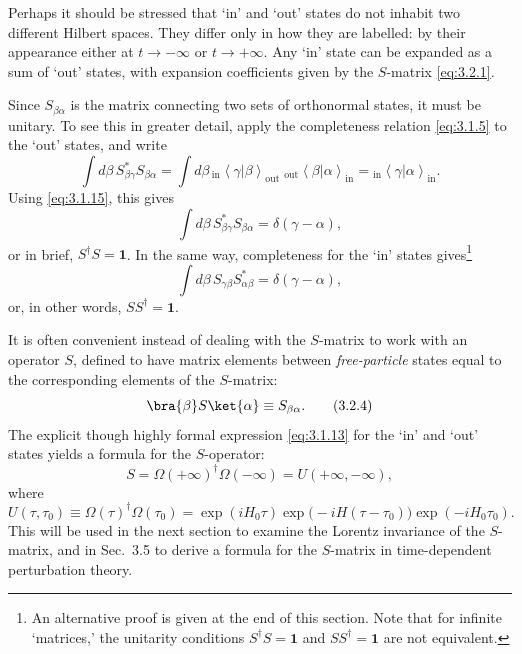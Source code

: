 Perhaps it should be stressed that `in' and `out' states do not inhabit two
different Hilbert spaces. They differ only in how they are labelled: by their
appearance either at $t\to-\infty$ or $t\to+\infty$. Any `in' state can be
expanded as a sum of `out' states, with expansion coefficients given by the
$S$-matrix \eqref{eq:3.2.1}.

Since $S_{\beta\alpha}$ is the matrix connecting two sets of orthonormal
states, it must be unitary. To see this in greater detail, apply the
completeness relation \eqref{eq:3.1.5} to the `out' states, and write
\[
\int d\beta\,S^*_{\beta\gamma}S_{\beta\alpha}
=\int d\beta\,
{}_{\mathrm{in}}\!\left\langle\gamma|\beta\right\rangle_{\mathrm{out}}
\;
{}_{\mathrm{out}}\!\left\langle\beta | \alpha\right\rangle_{\mathrm{in}}
={}_{\mathrm{in}}\!\left\langle\gamma
|\alpha\right\rangle_{\mathrm{in}}.
\]
Using \eqref{eq:3.1.15}, this gives
\begin{equation}
\int d\beta\,S^*_{\beta\gamma}S_{\beta\alpha}
=\delta(\gamma-\alpha),
\tag{3.2.2}\label{eq:3.2.2}
\end{equation}
or in brief, $S^\dagger S=\mathbf{1}$. In the same way, completeness for the
`in' states gives\footnote{An alternative proof is given at the end of this
section. Note that for infinite `matrices,' the unitarity conditions
$S^\dagger S=\mathbf{1}$ and $SS^\dagger=\mathbf{1}$ are not equivalent.}
\begin{equation}
\int d\beta\,S_{\gamma\beta}S^*_{\alpha\beta}
=\delta(\gamma-\alpha),
\tag{3.2.3}\label{eq:3.2.3}
\end{equation}
or, in other words, $SS^\dagger=\mathbf{1}$.

It is often convenient instead of dealing with the $S$-matrix to work with
an operator $S$, defined to have matrix elements between \textit{free-particle}
states equal to the corresponding elements of the $S$-matrix:
\begin{equation}
\bra{\beta}S\ket{\alpha}\equiv S_{\beta\alpha}.
\tag{3.2.4}\label{eq:3.2.4}
\end{equation}
The explicit though highly formal expression \eqref{eq:3.1.13} for the `in' and `out'
states yields a formula for the $S$-operator:
\begin{equation}
S=\Omega(+\infty)^\dagger\Omega(-\infty)=U(+\infty,-\infty),
\tag{3.2.5}\label{eq:3.2.5}
\end{equation}
where
\begin{equation}
U(\tau,\tau_0)\equiv\Omega(\tau)^\dagger\Omega(\tau_0)
=\exp(iH_0\tau)\exp\bigl(-iH(\tau-\tau_0)\bigr)
\exp(-iH_0\tau_0).
\tag{3.2.6}\label{eq:3.2.6}
\end{equation}
This will be used in the next section to examine the Lorentz invariance of the
$S$-matrix, and in Sec.~3.5 to derive a formula for the $S$-matrix in
time-dependent perturbation theory.

